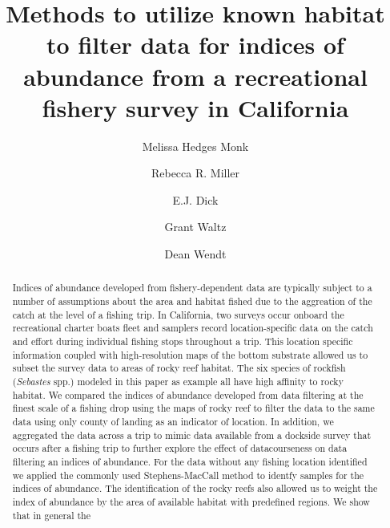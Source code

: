 \documentclass[
  12pt,
  authoryear,
  preprint,
  3p]{elsarticle}
\begin{document}
\begin{frontmatter}
\title{Methods to utilize known habitat to filter data for indices of
abundance from a recreational fishery survey in California}
\author[1]{Melissa Hedges Monk%
%
}
\author[2]{Rebecca R. Miller%
%
}
\author[1]{E.J. Dick%
%
}
\author[33]{Grant Waltz%
%
}
\author[3]{Dean Wendt%
%
}









        
\begin{abstract}
Indices of abundance developed from fishery-dependent data are typically
subject to a number of assumptions about the area and habitat fished due
to the aggreation of the catch at the level of a fishing trip. In
California, two surveys occur onboard the recreational charter boats
fleet and samplers record location-specific data on the catch and effort
during individual fishing stops throughout a trip. This location
specific information coupled with high-resolution maps of the bottom
substrate allowed us to subset the survey data to areas of rocky reef
habitat. The six species of rockfish (\emph{Sebastes} spp.) modeled in
this paper as example all have high affinity to rocky habitat. We
compared the indices of abundance developed from data filtering at the
finest scale of a fishing drop using the maps of rocky reef to filter
the data to the same data using only county of landing as an indicator
of location. In addition, we aggregated the data across a trip to mimic
data available from a dockside survey that occurs after a fishing trip
to further explore the effect of datacourseness on data filtering an
indices of abundance. For the data without any fishing location
identified we applied the commonly used Stephens-MacCall method to
identfy samples for the indices of abundance. The identification of the
rocky reefs also allowed us to weight the index of abundance by the area
of available habitat with predefined regions. We show that in general
the
\end{abstract}






\end{frontmatter}
\end{document}

